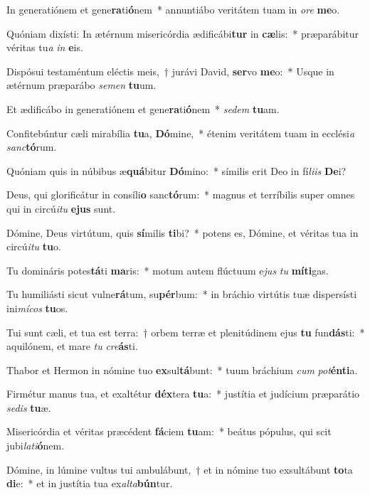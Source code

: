\item In generatiónem et gene\textbf{ra}ti\textbf{ó}nem~* annuntiábo veritátem tuam in \textit{o}\textit{re} \textbf{me}o.
\item Quóniam dixísti: In ætérnum misericórdia ædificábi\textbf{tur} in \textbf{cæ}lis:~* præparábitur véritas tu\textit{a} \textit{in} \textbf{e}is.
\item Dispósui testaméntum eléctis meis,~† jurávi David, \textbf{ser}vo \textbf{me}o:~* Usque in ætérnum præparábo \textit{se}\textit{men} \textbf{tu}um.
\item Et ædificábo in generatiónem et gene\textbf{ra}ti\textbf{ó}nem~* \textit{se}\textit{dem} \textbf{tu}am.
\item Confitebúntur cæli mirabília \textbf{tu}a, \textbf{Dó}mine,~* étenim veritátem tuam in ecclési\textit{a} \textit{sanc}\textbf{tó}rum.
\item Quóniam quis in núbibus æ\textbf{quá}bitur \textbf{Dó}mino:~* símilis erit Deo in fí\textit{li}\textit{is} \textbf{De}i?
\item Deus, qui glorificátur in consíli\textbf{o} sanc\textbf{tó}rum:~* magnus et terríbilis super omnes qui in circú\textit{i}\textit{tu} \textbf{e}\textbf{jus} sunt.
\item Dómine, Deus virtútum, quis \textbf{sí}milis \textbf{ti}bi?~* potens es, Dómine, et véritas tua in circú\textit{i}\textit{tu} \textbf{tu}o.
\item Tu domináris potes\textbf{tá}ti \textbf{ma}ris:~* motum autem flúctuum e\textit{jus} \textit{tu} \textbf{mí}\textbf{ti}gas.
\item Tu humiliásti sicut vulne\textbf{rá}tum, su\textbf{pér}bum:~* in bráchio virtútis tuæ dispersísti ini\textit{mí}\textit{cos} \textbf{tu}os.
\item Tui sunt cæli, et tua est terra:~† orbem terræ et plenitúdinem ejus \textbf{tu} fun\textbf{dás}ti:~* aquilónem, et mare \textit{tu} \textit{cre}\textbf{ás}ti.
\item Thabor et Hermon in nómine tuo \textbf{ex}sul\textbf{tá}bunt:~* tuum bráchium \textit{cum} \textit{pot}\textbf{én}\textbf{ti}a.
\item Firmétur manus tua, et exaltétur \textbf{déx}tera \textbf{tu}a:~* justítia et judícium præparátio \textit{se}\textit{dis} \textbf{tu}æ.
\item Misericórdia et véritas præcédent \textbf{fá}ciem \textbf{tu}am:~* beátus pópulus, qui scit jubi\textit{la}\textit{ti}\textbf{ó}nem.
\item Dómine, in lúmine vultus tui ambulábunt,~† et in nómine tuo exsultábunt \textbf{to}ta \textbf{di}e:~* et in justítia tua ex\textit{al}\textit{ta}\textbf{bún}tur.

